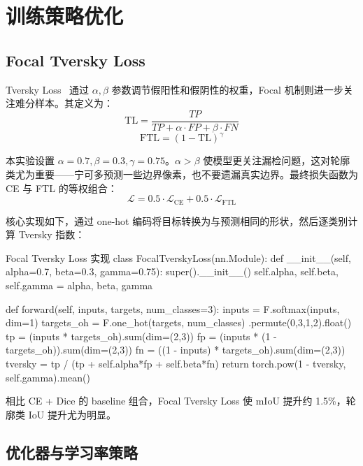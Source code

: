 \section{训练策略优化}

\subsection{Focal Tversky Loss}

Tversky Loss~\cite{salehi2017tversky} 通过 $\alpha, \beta$ 参数调节假阳性和假阴性的权重，Focal 机制则进一步关注难分样本。其定义为：
\begin{equation}
    \text{TL} = \frac{TP}{TP + \alpha \cdot FP + \beta \cdot FN}
\end{equation}
\begin{equation}
    \text{FTL} = (1 - \text{TL})^\gamma
\end{equation}

本实验设置 $\alpha=0.7, \beta=0.3, \gamma=0.75$。$\alpha > \beta$ 使模型更关注漏检问题，这对轮廓类尤为重要——宁可多预测一些边界像素，也不要遗漏真实边界。最终损失函数为 CE 与 FTL 的等权组合：
\begin{equation}
    \mathcal{L} = 0.5 \cdot \mathcal{L}_{\text{CE}} + 0.5 \cdot \mathcal{L}_{\text{FTL}}
\end{equation}

核心实现如下，通过 one-hot 编码将目标转换为与预测相同的形状，然后逐类别计算 Tversky 指数：

\begin{codeblock}{Focal Tversky Loss 实现}
class FocalTverskyLoss(nn.Module):
    def __init__(self, alpha=0.7, beta=0.3, gamma=0.75):
        super().__init__()
        self.alpha, self.beta, self.gamma = alpha, beta, gamma

    def forward(self, inputs, targets, num_classes=3):
        inputs = F.softmax(inputs, dim=1)
        targets_oh = F.one_hot(targets, num_classes)
                     .permute(0,3,1,2).float()
        tp = (inputs * targets_oh).sum(dim=(2,3))
        fp = (inputs * (1 - targets_oh)).sum(dim=(2,3))
        fn = ((1 - inputs) * targets_oh).sum(dim=(2,3))
        tversky = tp / (tp + self.alpha*fp + self.beta*fn)
        return torch.pow(1 - tversky, self.gamma).mean()
\end{codeblock}

相比 CE + Dice 的 baseline 组合，Focal Tversky Loss 使 mIoU 提升约 1.5\%，轮廓类 IoU 提升尤为明显。

\subsection{优化器与学习率策略}


